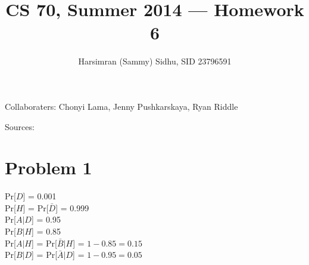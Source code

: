 \documentclass[11pt,letterpaper]{article}
\title{CS 70, Summer 2014 --- Homework 6} %
\author{Harsimran (Sammy) Sidhu, SID 23796591} %
\begin{document}
\maketitle

Collaboraters: Chonyi Lama, Jenny Pushkarskaya, Ryan Riddle

Sources: 

\section*{Problem 1} %
Pr[$D$] = 0.001\\
Pr[$H$] =  Pr[$\bar{D}$] = 0.999\\
Pr[$A|D$] = 0.95\\
Pr[$B|H$] = 0.85\\
Pr[$A|H$] = Pr[$\bar{B}|H$] = $1-0.85 = 0.15$\\
Pr[$B|D$] = Pr[$\bar{A}|D$] = $1-0.95 = 0.05$
\end{document}
